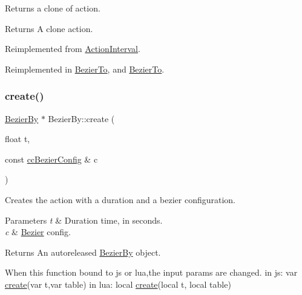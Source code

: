 Returns a clone of action.

\begin{DoxyReturn}{Returns}
A clone action. 
\end{DoxyReturn}


Reimplemented from \hyperlink{classActionInterval_abc93ce0c2f54a90eb216a7803f25f44a}{Action\+Interval}.



Reimplemented in \hyperlink{classBezierTo_a3cb15fbd6d2b9038ab3f25608765d54a}{Bezier\+To}, and \hyperlink{classBezierTo_ace522cd65d274c3f0a77c7925a2f12d5}{Bezier\+To}.

\mbox{\label{classBezierBy_adc16945f587b0e7850106751d8f5eaef}} 
\subsubsection{\texorpdfstring{create()}{create()}\hspace{0.1cm}{\footnotesize\ttfamily [1/2]}}
{\footnotesize\ttfamily \hyperlink{classBezierBy}{Bezier\+By} $\ast$ Bezier\+By\+::create (\begin{DoxyParamCaption}\item[{float}]{t,  }\item[{const \hyperlink{struct__ccBezierConfig}{cc\+Bezier\+Config} \&}]{c }\end{DoxyParamCaption})\hspace{0.3cm}{\ttfamily [static]}}

Creates the action with a duration and a bezier configuration. 
\begin{DoxyParams}{Parameters}
{\em t} & Duration time, in seconds. \\
\hline
{\em c} & \hyperlink{structBezier}{Bezier} config. \\
\hline
\end{DoxyParams}
\begin{DoxyReturn}{Returns}
An autoreleased \hyperlink{classBezierBy}{Bezier\+By} object. 
\begin{DoxyCode}
When \textcolor{keyword}{this} \textcolor{keyword}{function} bound to js or lua,the input params are changed.
in js: var \hyperlink{classBezierBy_adc16945f587b0e7850106751d8f5eaef}{create}(var t,var table)
in lua: local \hyperlink{classBezierBy_adc16945f587b0e7850106751d8f5eaef}{create}(local t, local table)
\end{DoxyCode}
 
\end{DoxyReturn}
\mbox{\label{classBezierBy_ab2e8aa132f37688fbbc9822139df2063}} 
